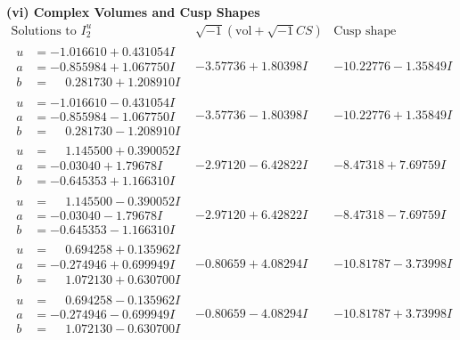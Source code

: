 \documentclass[1p]{elsarticle_modified}
\theoremstyle{definition}
\newcommand{\I}{\sqrt{-1}}
\begin{document}
\newpage\flushleft \textbf{(vi) Complex Volumes and Cusp Shapes}
$$\begin{array}{c|c|c}  
\text{Solutions to }I^u_{2}& \I (\text{vol} + \sqrt{-1}CS) & \text{Cusp shape}\\
 \hline 
\begin{aligned}
u &= -1.016610 + 0.431054 I \\
a &= -0.855984 + 1.067750 I \\
b &= \phantom{-}0.281730 + 1.208910 I\end{aligned}
 & -3.57736 + 1.80398 I & -10.22776 - 1.35849 I \\ \hline\begin{aligned}
u &= -1.016610 - 0.431054 I \\
a &= -0.855984 - 1.067750 I \\
b &= \phantom{-}0.281730 - 1.208910 I\end{aligned}
 & -3.57736 - 1.80398 I & -10.22776 + 1.35849 I \\ \hline\begin{aligned}
u &= \phantom{-}1.145500 + 0.390052 I \\
a &= -0.03040 + 1.79678 I \\
b &= -0.645353 + 1.166310 I\end{aligned}
 & -2.97120 - 6.42822 I & -8.47318 + 7.69759 I \\ \hline\begin{aligned}
u &= \phantom{-}1.145500 - 0.390052 I \\
a &= -0.03040 - 1.79678 I \\
b &= -0.645353 - 1.166310 I\end{aligned}
 & -2.97120 + 6.42822 I & -8.47318 - 7.69759 I \\ \hline\begin{aligned}
u &= \phantom{-}0.694258 + 0.135962 I \\
a &= -0.274946 + 0.699949 I \\
b &= \phantom{-}1.072130 + 0.630700 I\end{aligned}
 & -0.80659 + 4.08294 I & -10.81787 - 3.73998 I \\ \hline\begin{aligned}
u &= \phantom{-}0.694258 - 0.135962 I \\
a &= -0.274946 - 0.699949 I \\
b &= \phantom{-}1.072130 - 0.630700 I\end{aligned}
 & -0.80659 - 4.08294 I & -10.81787 + 3.73998 I \\ \hline\begin{aligned}

\end{aligned}
\end{array}$$
\end{document}
